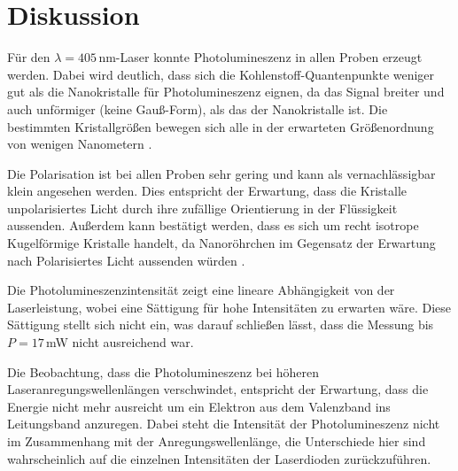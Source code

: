 \newpage
\section{Diskussion}
\label{sec:conclusion}

Für den $\lambda=405\,\si{\nano\meter}$-Laser konnte Photolumineszenz in allen Proben erzeugt werden.
Dabei wird deutlich, dass sich die Kohlenstoff-Quantenpunkte weniger gut als die Nanokristalle für Photolumineszenz eignen, da das Signal breiter und auch unförmiger (keine Gauß-Form), als das der Nanokristalle ist.
Die bestimmten Kristallgrößen bewegen sich alle in der erwarteten Größenordnung von wenigen Nanometern \cite{anleitung}.

Die Polarisation ist bei allen Proben sehr gering und kann als vernachlässigbar klein angesehen werden.
Dies entspricht der Erwartung, dass die Kristalle unpolarisiertes Licht durch ihre zufällige Orientierung in der Flüssigkeit aussenden.
Außerdem kann bestätigt werden, dass es sich um recht isotrope Kugelförmige Kristalle handelt, da Nanoröhrchen im Gegensatz der Erwartung nach Polarisiertes Licht 
aussenden würden \cite{Rods}.

Die Photolumineszenzintensität zeigt eine lineare Abhängigkeit von der Laserleistung,
wobei eine Sättigung für hohe Intensitäten zu erwarten wäre.
Diese Sättigung stellt sich nicht ein, was darauf schließen lässt, dass die Messung bis $P=17\,$mW nicht ausreichend war.

Die Beobachtung, dass die Photolumineszenz bei höheren Laseranregungswellenlängen 
verschwindet, entspricht der Erwartung, dass die Energie nicht mehr ausreicht um ein Elektron aus dem Valenzband ins Leitungsband anzuregen.
Dabei steht die Intensität der Photolumineszenz nicht im Zusammenhang mit der Anregungswellenlänge, die Unterschiede hier 
sind wahrscheinlich auf die einzelnen Intensitäten der Laserdioden zurückzuführen.